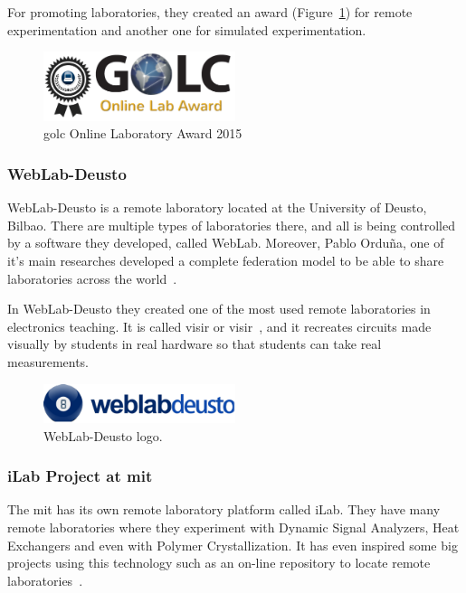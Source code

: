 For promoting laboratories, they created an award (Figure~\ref{fig:golc_award}) for remote
experimentation and another one for simulated experimentation.

\begin{figure}[!htbp]
	\centering
	\includegraphics[width=0.5\textwidth]{fig/golc-award}
	\caption{\acrshort{golc} Online Laboratory Award 2015}\label{fig:golc_award}
\end{figure}

\subsubsection{WebLab-Deusto}

WebLab-Deusto is a remote laboratory located at the University of Deusto, Bilbao. There are multiple
types of laboratories there, and all is being controlled by a software they developed, called
WebLab. Moreover, Pablo Orduña, one of it's main researches developed a complete federation model
to be able to share laboratories across the world~\cite{porduna_phd}.

In WebLab-Deusto they created one of the most used remote laboratories in electronics teaching. It
is called \acrlong{visir} or \acrshort{visir}~\cite{visir}, and it recreates circuits made visually
by students in real hardware so that students can take real measurements.

\begin{figure}[!htbp]
	\centering
	\includegraphics[width=0.5\textwidth]{fig/weblab}
	\caption{WebLab-Deusto logo.}
\end{figure}

\subsubsection{iLab Project at \acrshort{mit}}

The \acrlong{mit} has its own remote laboratory platform called iLab. They have many remote
laboratories where they experiment with Dynamic Signal Analyzers, Heat Exchangers and even with
Polymer Crystallization. It has even inspired some big projects using this technology such as an
on-line repository to locate remote laboratories~\cite{ilabs_multi}.

